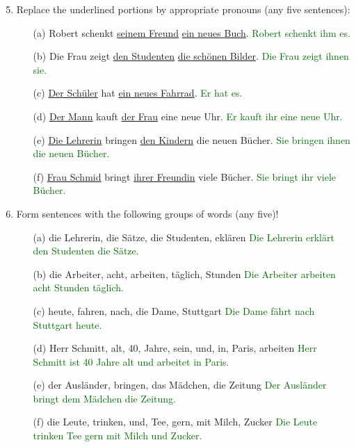 \documentclass{article}
\begin{document}
\begin{enumerate}
    \setcounter{enumi}{4}
    \item Replace the underlined portions by appropriate pronouns (any five sentences):
    \begin{enumerate}
        \item[(a)] Robert schenkt \underline{seinem Freund} \underline{ein neues Buch}. \textcolor{darkgreen}{Robert schenkt ihm es.}
        \item[(b)] Die Frau zeigt \underline{den Studenten} \underline{die schönen Bilder}. \textcolor{darkgreen}{Die Frau zeigt ihnen sie.}
        \item[(c)] \underline{Der Schüler} hat \underline{ein neues Fahrrad}. \textcolor{darkgreen}{Er hat es.}
        \item[(d)] \underline{Der Mann} kauft \underline{der Frau} eine neue Uhr. \textcolor{darkgreen}{Er kauft ihr eine neue Uhr.}
        \item[(e)] \underline{Die Lehrerin} bringen \underline{den Kindern} die neuen Bücher. \textcolor{darkgreen}{Sie bringen ihnen die neuen Bücher.}
        \item[(f)] \underline{Frau Schmid} bringt \underline{ihrer Freundin} viele Bücher.  \textcolor{darkgreen}{Sie bringt ihr viele Bücher.}
    \end{enumerate}
    \item Form sentences with the following groups of words (any five)!
    \begin{enumerate}
        \item[(a)] die Lehrerin, die Sätze, die Studenten, eklären \textcolor{darkgreen}{Die Lehrerin erklärt den Studenten die Sätze.}
        \item[(b)] die Arbeiter, acht, arbeiten, täglich, Stunden \textcolor{darkgreen}{Die Arbeiter arbeiten acht Stunden täglich.}
        \item[(c)] heute, fahren, nach, die Dame, Stuttgart \textcolor{darkgreen}{Die Dame fährt nach Stuttgart heute.} 
        \item[(d)] Herr Schmitt, alt, 40, Jahre, sein, und, in, Paris, arbeiten \textcolor{darkgreen}{Herr Schmitt ist 40 Jahre alt und arbeitet in Paris.}
        \item[(e)] der Ausländer, bringen, das Mädchen, die Zeitung \textcolor{darkgreen}{Der Ausländer bringt dem Mädchen die Zeitung.}
        \item[(f)] die Leute, trinken, und, Tee, gern, mit Milch, Zucker \textcolor{darkgreen}{Die Leute trinken Tee gern mit Milch und Zucker.}

\end{enumerate}
\end{enumerate}
\end{document}
